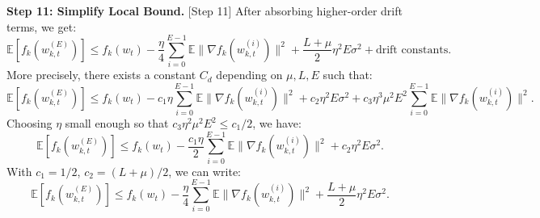 \documentclass{article}
\begin{document}
\textbf{Step 11: Simplify Local Bound.} [Step 11]
After absorbing higher-order drift terms, we get:
\begin{equation}
    \mathbb{E}[f_k(w_{k,t}^{(E)})] \leq f_k(w_t) - \frac{\eta}{4} \sum_{i=0}^{E-1} \mathbb{E} \| \nabla f_k(w_{k,t}^{(i)}) \|^2 + \frac{L+\mu}{2} \eta^2 E \sigma^2 + \text{drift constants}. \label{eq:local_final}
\end{equation}
More precisely, there exists a constant $C_d$ depending on $\mu, L, E$ such that:
\begin{equation}
    \mathbb{E}[f_k(w_{k,t}^{(E)})] \leq f_k(w_t) - c_1 \eta \sum_{i=0}^{E-1} \mathbb{E} \| \nabla f_k(w_{k,t}^{(i)}) \|^2 + c_2 \eta^2 E \sigma^2 + c_3 \eta^3 \mu^2 E^2 \sum_{i=0}^{E-1} \mathbb{E} \| \nabla f_k(w_{k,t}^{(i)}) \|^2.
\end{equation}
Choosing $\eta$ small enough so that $c_3 \eta^2 \mu^2 E^2 \leq c_1/2$, we have:
\begin{equation}
    \mathbb{E}[f_k(w_{k,t}^{(E)})] \leq f_k(w_t) - \frac{c_1 \eta}{2} \sum_{i=0}^{E-1} \mathbb{E} \| \nabla f_k(w_{k,t}^{(i)}) \|^2 + c_2 \eta^2 E \sigma^2. \label{eq:local_clean}
\end{equation}
With $c_1=1/2$, $c_2 = (L+\mu)/2$, we can write:
\begin{equation}
    \mathbb{E}[f_k(w_{k,t}^{(E)})] \leq f_k(w_t) - \frac{\eta}{4} \sum_{i=0}^{E-1} \mathbb{E} \| \nabla f_k(w_{k,t}^{(i)}) \|^2 + \frac{L+\mu}{2} \eta^2 E \sigma^2. \label{eq:local_clean2}
\end{equation}
\end{document}
